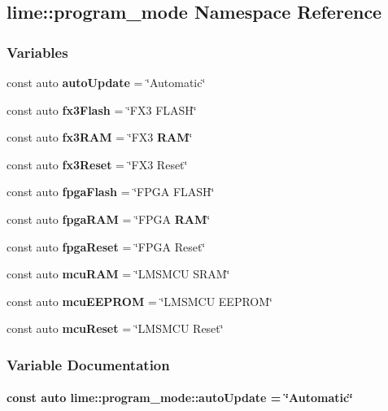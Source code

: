 \subsection{lime\+:\+:program\+\_\+mode Namespace Reference}
\label{namespacelime_1_1program__mode}
\subsubsection*{Variables}
\begin{DoxyCompactItemize}
\item 
const auto {\bf auto\+Update} = \char`\"{}Automatic\char`\"{}
\item 
const auto {\bf fx3\+Flash} = \char`\"{}F\+X3 F\+L\+A\+SH\char`\"{}
\item 
const auto {\bf fx3\+R\+AM} = \char`\"{}F\+X3 {\bf R\+AM}\char`\"{}
\item 
const auto {\bf fx3\+Reset} = \char`\"{}F\+X3 Reset\char`\"{}
\item 
const auto {\bf fpga\+Flash} = \char`\"{}F\+P\+GA F\+L\+A\+SH\char`\"{}
\item 
const auto {\bf fpga\+R\+AM} = \char`\"{}F\+P\+GA {\bf R\+AM}\char`\"{}
\item 
const auto {\bf fpga\+Reset} = \char`\"{}F\+P\+GA Reset\char`\"{}
\item 
const auto {\bf mcu\+R\+AM} = \char`\"{}L\+M\+S\+M\+CU S\+R\+AM\char`\"{}
\item 
const auto {\bf mcu\+E\+E\+P\+R\+OM} = \char`\"{}L\+M\+S\+M\+CU E\+E\+P\+R\+OM\char`\"{}
\item 
const auto {\bf mcu\+Reset} = \char`\"{}L\+M\+S\+M\+CU Reset\char`\"{}
\end{DoxyCompactItemize}


\subsubsection{Variable Documentation}
\paragraph[{auto\+Update}]{\setlength{\rightskip}{0pt plus 5cm}const auto lime\+::program\+\_\+mode\+::auto\+Update = \char`\"{}Automatic\char`\"{}}\label{namespacelime_1_1program__mode_af184ff52a540102b112ed590a6ab6b43}


